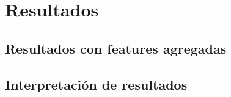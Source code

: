 \chapter{Resultados}
\label{ch:resultados}

\section{Resultados con features agregadas}
\label{sec:resultados_features}


\section{Interpretación de resultados}
\label{sec:interpretacion}

